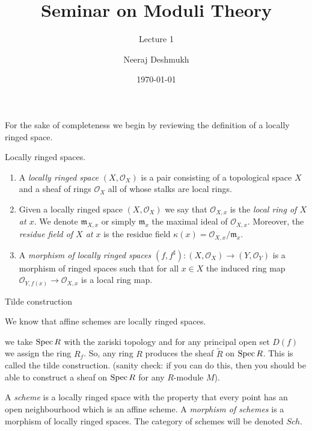 \documentclass[ignorenonframetext,t]{beamer}
\title[Moduli@IISERP]{Seminar on Moduli Theory}
\subtitle{Lecture 1}
\author{Neeraj Deshmukh}
\date{\today}
\newcommand{\Spec}{{\rm Spec \,}}
\renewcommand{\tilde}{\widetilde}
\theoremstyle{definition}
\begin{document}
	
	
\begin{frame}
\titlepage
\end{frame}

\begin{frame}
For the sake of completeness we begin by reviewing the definition of a locally ringed space.

\begin{definition}
	\label{definition-locally-ringed-space}
	Locally ringed spaces.
	\begin{enumerate}
		\item A {\it locally ringed space $(X, \mathcal{O}_X)$}
		is a pair consisting of a
		topological space $X$ and a sheaf of rings $\mathcal{O}_X$ all of whose stalks
		are local rings.
		\item Given a locally ringed space $(X, \mathcal{O}_X)$ we say that
		$\mathcal{O}_{X, x}$ is the {\it local ring of $X$ at $x$}.
		We denote $\mathfrak{m}_{X, x}$ or simply $\mathfrak{m}_x$
		the maximal ideal of $\mathcal{O}_{X, x}$. Moreover, the
		{\it residue field of $X$ at $x$} is the residue field
		$\kappa(x) = \mathcal{O}_{X, x}/\mathfrak{m}_x$.
		\item A {\it morphism of locally ringed spaces}
		$(f, f^\sharp) : (X, \mathcal{O}_X) \to (Y, \mathcal{O}_Y)$
		is a morphism of ringed spaces such that for all $x \in X$
		the induced ring map $\mathcal{O}_{Y, f(x)} \to \mathcal{O}_{X, x}$ is a
		local ring map.
	\end{enumerate}
\end{definition}
\end{frame}

\begin{frame}{Tilde construction}

We know that affine schemes are locally ringed spaces.
\end{frame}
we take $\Spec R$ with the zariski topology and for any principal open set $D(f)$ we assign the ring $R_f$. So, any ring $R$ produces the sheaf $\tilde{R}$ on $\Spec R$. This is called the tilde construction. (sanity check: if you can do this, then you should be able to construct a sheaf on $\Spec R$ for any $R$-module $M$).

\begin{frame}
\begin{definition}
	A {\it scheme} is a locally ringed space with the property that
	every point has an open neighbourhood which is an affine scheme.
	A {\it morphism of schemes} is a morphism of locally
	ringed spaces. The category of schemes will be denoted
	$Sch$.
\end{definition}

\end{frame}
\end{document}
